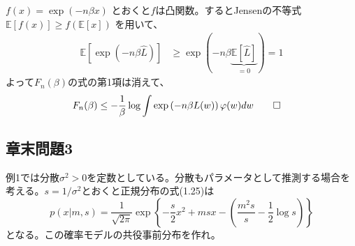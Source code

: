 \documentclass[dvipdfmx,11pt]{jsarticle}
\newcommand{\EE}{{\mathbb{E}}}
\begin{document}
$f(x) = \exp(-n\beta x)$ とおくと$f$は凸関数。するとJensenの不等式$\EE[f(x)] \geq f(\EE[x])$ を用いて、
\begin{align*}
\EE[\exp(-n\beta \hat{L})] &\geq \exp(-n\beta \underbrace{\EE[\hat{L}]}_{=0}) = 1
\end{align*}
よって$F_n(\beta)$の式の第1項は消えて、
\begin{align*}
F_n(\beta) &\leq - \frac1\beta \log \int \exp\left(-n\beta L(w)\right)\varphi(w) dw\qed
\end{align*}

\subsection*{章末問題3}
例1では分散$\sigma^2>0$を定数としている。分散もパラメータとして推測する場合を考える。$s=1/\sigma^2$とおくと正規分布の式(1.25)は
$$p(x|m,s) = \frac1{\sqrt{2\pi}}\exp\left\{-\frac{s}2 x^2 + msx - \left(\frac{m^2s}s-\frac12\log s\right)\right\}$$
となる。この確率モデルの共役事前分布を作れ。
\end{document}
